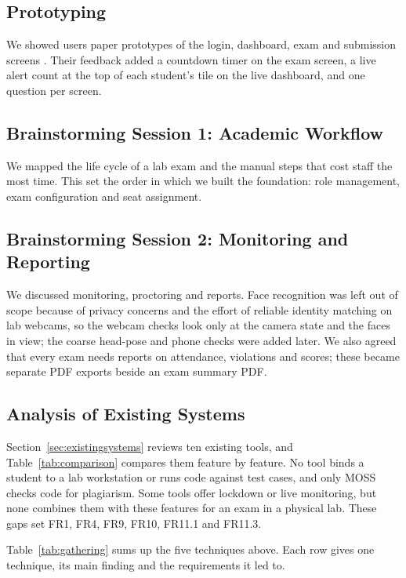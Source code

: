 \subsection{Prototyping}
We showed users paper prototypes of the login, dashboard, exam and submission screens \cite{sommerville}. Their feedback added a countdown timer on the exam screen, a live alert count at the top of each student's tile on the live dashboard, and one question per screen.

\subsection{Brainstorming Session 1: Academic Workflow}
We mapped the life cycle of a lab exam and the manual steps that cost staff the most time. This set the order in which we built the foundation: role management, exam configuration and seat assignment.

\subsection{Brainstorming Session 2: Monitoring and Reporting}
We discussed monitoring, proctoring and reports. Face recognition was left out of scope because of privacy concerns and the effort of reliable identity matching on lab webcams, so the webcam checks look only at the camera state and the faces in view; the coarse head-pose and phone checks were added later. We also agreed that every exam needs reports on attendance, violations and scores; these became separate PDF exports beside an exam summary PDF.

\subsection{Analysis of Existing Systems}
Section~\ref{sec:existingsystems} reviews ten existing tools, and Table~\ref{tab:comparison} compares them feature by feature. No tool binds a student to a lab workstation or runs code against test cases, and only MOSS checks code for plagiarism. Some tools offer lockdown or live monitoring, but none combines them with these features for an exam in a physical lab. These gaps set FR1, FR4, FR9, FR10, FR11.1 and FR11.3.

Table~\ref{tab:gathering} sums up the five techniques above. Each row gives one technique, its main finding and the requirements it led to.

